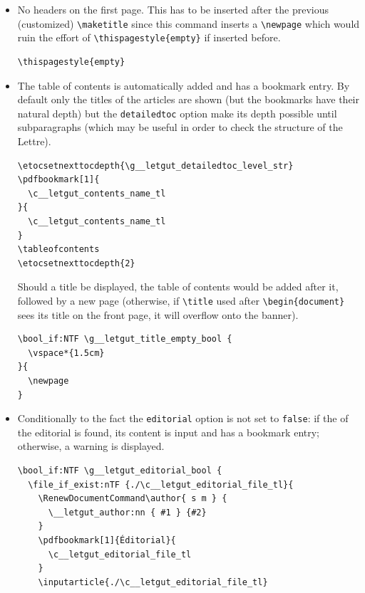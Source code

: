 \documentclass{letgut}
\begin{document}
\begin{itemize}
\item No headers on the first page. This has to be inserted after the previous
(customized) \lstinline+\maketitle+ since this command inserts a \lstinline+\newpage+ which would
ruin the effort of \lstinline+\thispagestyle{empty}+ if inserted before.
\begin{lstlisting}
\thispagestyle{empty}
\end{lstlisting}
\item The table of contents is automatically added and has a bookmark entry. By
default only the titles of the articles are shown (but the bookmarks have
their natural depth) but the \lstinline+detailedtoc+ option make its depth possible
until subparagraphs (which may be useful in order to check the structure of
the Lettre).
\begin{lstlisting}
\etocsetnexttocdepth{\g__letgut_detailedtoc_level_str}
\pdfbookmark[1]{
  \c__letgut_contents_name_tl
}{
  \c__letgut_contents_name_tl
}
\tableofcontents
\etocsetnexttocdepth{2}
\end{lstlisting}
Should a title be displayed, the table of contents would be added after it,
followed by a new page (otherwise, if \lstinline+\title+ used after \lstinline+\begin{document}+
sees its title on the front page, it will overflow onto the banner).
\begin{lstlisting}
\bool_if:NTF \g__letgut_title_empty_bool {
  \vspace*{1.5cm}
}{
  \newpage
}
\end{lstlisting}
\item Conditionally to the fact the \lstinline+editorial+ option is not set to \lstinline+false+: if the
 of the editorial is found, its content is input and
has a bookmark entry; otherwise, a warning is displayed.
\begin{lstlisting}
\bool_if:NTF \g__letgut_editorial_bool {
  \file_if_exist:nTF {./\c__letgut_editorial_file_tl}{
    \RenewDocumentCommand\author{ s m } {
      \__letgut_author:nn { #1 } {#2}
    }
    \pdfbookmark[1]{Éditorial}{
      \c__letgut_editorial_file_tl
    }
    \inputarticle{./\c__letgut_editorial_file_tl}
\end{lstlisting}
\end{itemize}
\end{document}

